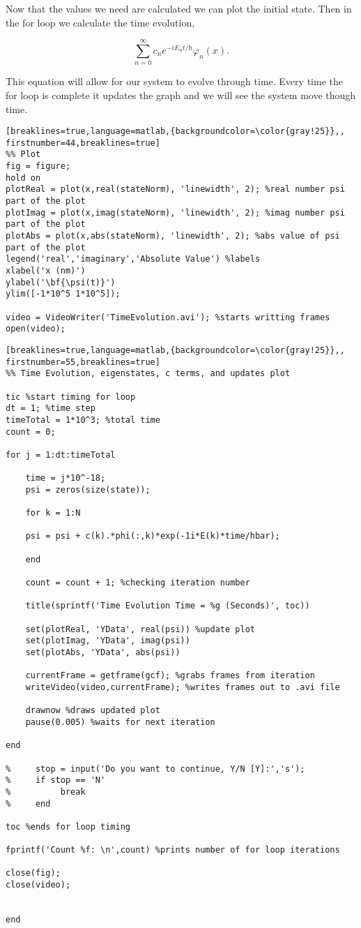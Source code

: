 \documentclass{article}
\begin{document}
Now that the values we need are calculated we can plot the initial state. Then in the for loop we calculate the time evolution,

$$
\sum_{n=0}^{\infty} c_{n}e^{-iE_{n}t/\hbar}\varphi_{n}(x).
$$

This equation will allow for our system to evolve through time. Every time the for loop is complete it updates the graph and we will see the system move though time. 

\begin{lstlisting}[breaklines=true,language=matlab,{backgroundcolor=\color{gray!25}},, firstnumber=44,breaklines=true]
%% Plot
fig = figure;
hold on
plotReal = plot(x,real(stateNorm), 'linewidth', 2); %real number psi part of the plot
plotImag = plot(x,imag(stateNorm), 'linewidth', 2); %imag number psi part of the plot
plotAbs = plot(x,abs(stateNorm), 'linewidth', 2); %abs value of psi part of the plot
legend('real','imaginary','Absolute Value') %labels
xlabel('x (nm)')
ylabel('\bf{\psi(t)}')
ylim([-1*10^5 1*10^5]);

video = VideoWriter('TimeEvolution.avi'); %starts writting frames
open(video);
\end{lstlisting}
  
  
    
\begin{lstlisting}[breaklines=true,language=matlab,{backgroundcolor=\color{gray!25}},, firstnumber=55,breaklines=true]
%% Time Evolution, eigenstates, c terms, and updates plot

tic %start timing for loop
dt = 1; %time step
timeTotal = 1*10^3; %total time
count = 0;

for j = 1:dt:timeTotal
    
    time = j*10^-18;
    psi = zeros(size(state));
        
    for k = 1:N
    
    psi = psi + c(k).*phi(:,k)*exp(-1i*E(k)*time/hbar);
    
    end
    
    count = count + 1; %checking iteration number
      
    title(sprintf('Time Evolution Time = %g (Seconds)', toc))
    
    set(plotReal, 'YData', real(psi)) %update plot
    set(plotImag, 'YData', imag(psi))
    set(plotAbs, 'YData', abs(psi))
    
    currentFrame = getframe(gcf); %grabs frames from iteration
    writeVideo(video,currentFrame); %writes frames out to .avi file
        
    drawnow %draws updated plot
    pause(0.005) %waits for next iteration
    
end
    
%     stop = input('Do you want to continue, Y/N [Y]:','s');
%     if stop == 'N'
%          break
%     end
   
toc %ends for loop timing

fprintf('Count %f: \n',count) %prints number of for loop iterations

close(fig);
close(video);


end
\end{lstlisting}
\end{document}

